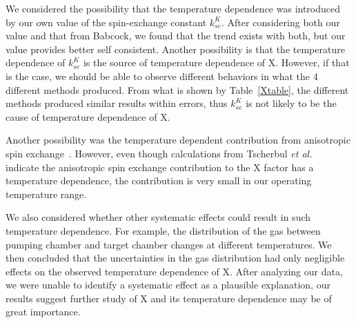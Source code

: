 We considered the possibility that the temperature dependence was introduced by our own value of the spin-exchange constant $k_{se}^{K}$. After considering both our value and that from Babcock, we found that the trend exists with both, but our value provides better self consistent. Another possibility is that the temperature dependence of $k_{se}^{K}$ is the source of temperature dependence of X. However, if that is the case, we should be able to observe different behaviors in what the 4 different methods produced. From what is shown by Table~\ref{Xtable}, the different methods produced similar results within errors, thus $k_{se}^K$ is not likely to be the cause of temperature dependence of X.

Another possibility was the temperature dependent contribution from anisotropic spin exchange~\cite{PhysRevA.81.032709}. However, even though calculations from Tscherbul \emph{et al.}~\cite{PhysRevLett.107.023204} indicate the anisotropic spin exchange contribution to the X factor has a temperature dependence, the contribution is very small in our operating temperature range.

We also considered whether other systematic effects could result in such temperature dependence. For example, the distribution of the gas between pumping chamber and target chamber changes at different temperatures. We then concluded that the uncertainties in the gas distribution had only negligible effects on the observed temperature dependence of X. After analyzing our data, we were unable to identify a systematic effect as a plausible explanation, our results suggest further study of X and its temperature dependence may be of great importance.
















